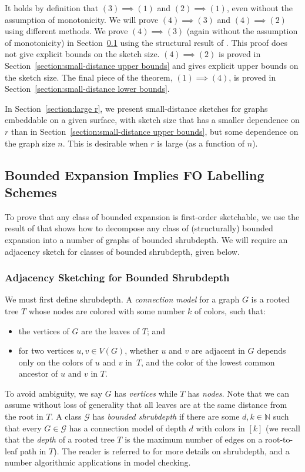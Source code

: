 \documentclass[11pt]{article}
\theoremstyle{definition}
\begin{document}
\noindent
It holds by definition that $(3) \implies (1)$ and $(2) \implies (1)$, even without the assumption
of monotonicity. We will prove $(4) \implies (3)$ and $(4) \implies (2)$ using different methods.
We prove $(4) \implies (3)$ (again without the assumption of monotonicity) in
Section~\ref{section:first-order sketching} using the structural result of \cite{GKN+20}. This proof
does not give explicit bounds on the sketch size. $(4) \implies (2)$ is proved in
Section~\ref{section:small-distance upper bounds} and gives explicit upper bounds on the sketch
size.  The final piece of the theorem, $(1) \implies (4)$, is proved in
Section~\ref{section:small-distance lower bounds}. 

In Section~\ref{section:large r}, we present small-distance sketches for graphs embeddable on a
given surface, with sketch size that has a smaller dependence on $r$ than in
Section~\ref{section:small-distance upper bounds}, but some dependence on the graph size $n$. This
is desirable when $r$ is large (as a function of $n$).


\subsection{Bounded Expansion Implies FO Labelling Schemes}
\label{section:first-order sketching}

To prove that any class of bounded expansion is first-order sketchable, we use the result of
\cite{GKN+20} that shows how to decompose any class of (structurally) bounded expansion into a
number of graphs of bounded shrubdepth. We will require an adjacency
sketch for classes of bounded shrubdepth,
given below.

\subsubsection{Adjacency Sketching for Bounded Shrubdepth}

We must first define shrubdepth.
A {\em{connection model}} for a graph $G$ is a rooted tree $T$ whose nodes are colored with some
number $k$ of colors, such that:
\begin{itemize}
\item the vertices of $G$ are  the leaves of $T$; and
\item for two vertices $u,v\in V(G)$, whether $u$ and $v$ are
adjacent in $G$ depends only on the colors of $u$ and $v$  in~$T$, and the color of the lowest
common ancestor of $u$ and $v$ in $T$.
\end{itemize}
To avoid ambiguity, we say $G$ has \emph{vertices} while $T$ has \emph{nodes}.
Note that we can assume without loss of generality that all leaves are at the same distance from the
root in $T$.  A class $\mathcal{G}$ has \emph{bounded shrubdepth} if there are some $d,k\in
\mathbb{N}$ such that every $G\in\mathcal{G}$ has a connection model of depth $d$ with colors in
$[k]$ (we recall that the \emph{depth} of a rooted tree $T$ is the
maximum number of edges on a root-to-leaf path in $T$). The reader is
referred to \cite{GHNOMR12,GHNOM19} for more details on shrubdepth, and a number
algorithmic applications in model checking.
\end{document}
